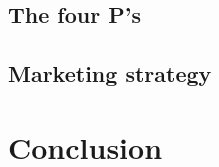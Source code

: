 \documentclass[12p]{article}
\begin{document}
\subsection{The four P's}

\subsection{Marketing strategy}


\newpage
\section{Conclusion}


\newpage



\end{document}
